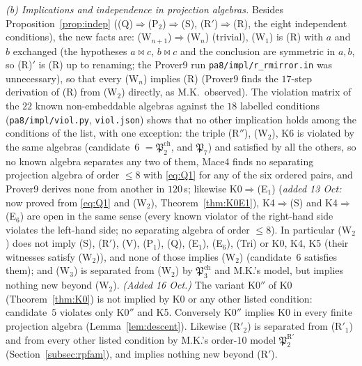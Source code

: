 \documentclass[11pt]{amsart}
\theoremstyle{definition}
\newcommand{\mt}{\bowtie}   %
\begin{document}
\emph{(b) Implications and independence in projection algebras.} Besides Proposition~\ref{prop:indep} ((Q)$\Rightarrow$(P$_2$)$\Rightarrow$(S), (R$'$)$\Rightarrow$(R), the eight independent conditions), the new facts are: (W$_{n+1}$)$\Rightarrow$(W$_n$) (trivial), (W$_1$) is (R) with $a$ and $b$ exchanged (the hypotheses $a\mt c$, $b\mt c$ and the conclusion are symmetric in $a,b$, so (R)$'$ is (R) up to renaming; the Prover9 run \texttt{pa8/impl/r\_rmirror.in} was unnecessary), so that every (W$_n$) implies (R) (Prover9 finds the $17$-step derivation of (R) from (W$_2$) directly, as M.K.\ observed). The violation matrix of the $22$ known non-embeddable algebras against the $18$ labelled conditions (\texttt{pa8/impl/viol.py}, \texttt{viol.json}) shows that no other implication holds among the conditions of the list, with one exception: the triple (R$''$), (W$_2$), K6 is violated by the same algebras (candidate~$6$ $=\mathfrak P^{\mathrm{ch}}_2$, and $\mathfrak P_7$) and satisfied by all the others, so no known algebra separates any two of them, Mace4 finds no separating projection algebra of order $\le8$ with \eqref{eq:Q1} for any of the six ordered pairs, and Prover9 derives none from another in $120$\,s; likewise K0$\Rightarrow$(E$_1$) (\emph{added 13 Oct:} now proved from \eqref{eq:Q1} and (W$_2$), Theorem~\ref{thm:K0E1}), K4$\Rightarrow$(S) and K4$\Rightarrow$(E$_6$) are open in the same sense (every known violator of the right-hand side violates the left-hand side; no separating algebra of order $\le8$). In particular (W$_2$) does not imply (S), (R$'$), (V), (P$_1$), (Q), (E$_1$), (E$_6$), (Tri) or K0, K4, K5 (their witnesses satisfy (W$_2$)), and none of those implies (W$_2$) (candidate~$6$ satisfies them); and (W$_3$) is separated from (W$_2$) by $\mathfrak P^{\mathrm{ch}}_3$ and M.K.'s model, but implies nothing new beyond (W$_2$). \emph{(Added 16 Oct.)} The variant K0$''$ of K0 (Theorem~\ref{thm:K0}) is not implied by K0 or any other listed condition: candidate~$5$ violates only K0$''$ and K5. Conversely K0$''$ implies K0 in every finite projection algebra (Lemma~\ref{lem:descent}). Likewise (R$'_2$) is separated from (R$'_1$) and from every other listed condition by M.K.'s order-$10$ model $\mathfrak P^{\mathrm R'}_2$ (Section~\ref{subsec:rpfam}), and implies nothing new beyond (R$'$).
\end{document}
